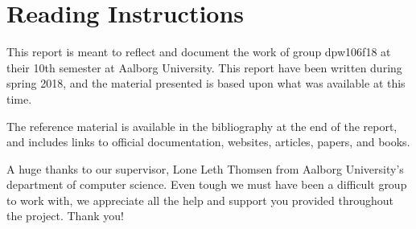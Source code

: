 \section*{Reading Instructions}
This report is meant to reflect and document the work of group dpw106f18 at their 10th semester at Aalborg University. This report have been written during spring 2018, and the material presented is based upon what was available at this time.

The reference material is available in the bibliography at the end of the report, and includes links to official documentation, websites, articles, papers, and books. 

A huge thanks to our supervisor, Lone Leth Thomsen from Aalborg University's department of computer science. Even tough we must have been a difficult group to work with, we appreciate all the help and support you provided throughout the project. Thank you!

